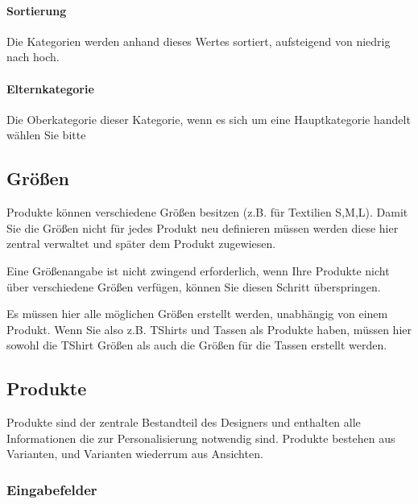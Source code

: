 \documentclass[letterpaper,10pt,ngerman]{sphinxmanual}
\begin{document}
\paragraph{Sortierung}
\label{\detokenize{hbe/products/categories:sortierung}}
Die Kategorien werden anhand dieses Wertes sortiert, aufsteigend von niedrig nach hoch.


\paragraph{Elternkategorie}
\label{\detokenize{hbe/products/categories:elternkategorie}}
Die Oberkategorie dieser Kategorie, wenn es sich um eine Hauptkategorie handelt wählen Sie bitte \sphinxcode{\sphinxupquote{\sphinxhyphen{}\sphinxhyphen{}\sphinxhyphen{}}}


\subsection{Größen}
\label{\detokenize{hbe/products/sizes:groszen}}\label{\detokenize{hbe/products/sizes::doc}}
Produkte können verschiedene Größen besitzen (z.B. für Textilien S,M,L). Damit Sie die Größen nicht für jedes
Produkt neu definieren müssen werden diese hier zentral verwaltet und später dem Produkt zugewiesen.

Eine Größenangabe ist nicht zwingend erforderlich, wenn Ihre Produkte nicht über verschiedene Größen verfügen,
können Sie diesen Schritt überspringen.

Es müssen hier alle möglichen Größen erstellt werden, unabhängig von einem Produkt. Wenn Sie also z.B.
T\sphinxhyphen{}Shirts und Tassen als Produkte haben, müssen hier sowohl die T\sphinxhyphen{}Shirt Größen als auch die Größen für die
Tassen erstellt werden.


\subsection{Produkte}
\label{\detokenize{hbe/products/products:produkte}}\label{\detokenize{hbe/products/products::doc}}
Produkte sind der zentrale Bestandteil des Designers und enthalten alle Informationen die zur Personalisierung notwendig
sind. Produkte bestehen aus Varianten, und Varianten wiederrum aus Ansichten.


\subsubsection{Eingabefelder}
\label{\detokenize{hbe/products/fields/index:eingabefelder}}\label{\detokenize{hbe/products/fields/index::doc}}
\end{document}
